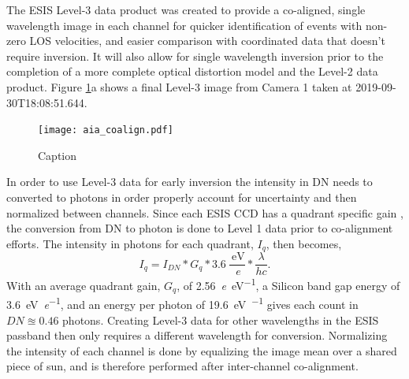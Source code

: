     
    	\newcommand{\vigfit}{[0.44, 0.34, 0.38, 0.5]}
    	\newcommand{\levthreetime}{2019-09-30T18:08:51.644}
    	
    	
    	The ESIS Level-3 data product was created to provide a co-aligned, single wavelength image in each channel for quicker identification of events with non-zero LOS velocities, and easier comparison with coordinated data that doesn't require inversion. 
    	It will also allow for single wavelength inversion prior to the completion of a more complete optical distortion model and the Level-2 data product.
    	Figure \ref{fig:coalign}a shows a final Level-3 image from Camera 1 taken at \levthreetime.
    	
  		\begin{figure}[htb!]
    		\centering
    		\texttt{[image: aia\_coalign.pdf]}
    		\caption{Caption}
    		\label{fig:coalign}
    	\end{figure}
    	
    
     	In order to use Level-3 data for early inversion the intensity in DN needs to  converted to photons in order properly account for uncertainty and then normalized between channels.
   		Since each ESIS CCD has a quadrant specific gain \citep{ESIS}, the conversion from DN to photon is done to Level 1 data prior to co-alignment efforts.
   		The intensity in photons for each quadrant, $I_q$, then becomes,
   		\begin{equation}
	   		I_q = I_{DN} * G_q * 3.6\ \frac{\SI{}{\electronvolt}}{\SI{}{\elementarycharge}} * \frac{\lambda}{hc}.
   		\end{equation}
		With an average quadrant gain, $G_q$, of \SI[per-mode=symbol]{2.56}{\elementarycharge\per\electronvolt}, a Silicon band gap energy of \SI[per-mode=symbol]{3.6}{\electronvolt\per\elementarycharge}, and an energy per \ov photon of \SI[per-mode=symbol]{19.6}{\electronvolt\per\photon} gives each count in $DN \approxeq 0.46$ photons.
		Creating Level-3 data for other wavelengths in the ESIS passband then only requires a different wavelength for conversion.
   		Normalizing the intensity of each channel is done by equalizing the image mean over a shared piece of sun, and is therefore performed after inter-channel co-alignment.
   		

